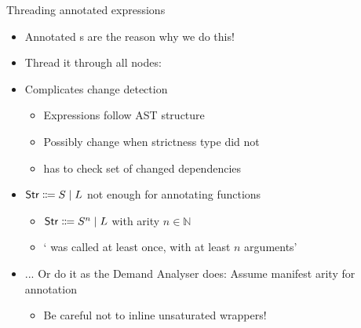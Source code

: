 \documentclass{haskellbeamer}
\begin{document}
\begin{frame}[fragile]{Threading annotated expressions}
  \begin{itemize}
    \item Annotated s are the reason why we do this!
    \item Thread it through all nodes: 
    \item Complicates change detection
      \begin{itemize}
        \item Expressions follow AST structure
        \item Possibly change when strictness type did not
        \item {} has to check set of changed dependencies
      \end{itemize}
    \item $\text{\textsf{Str}} \Coloneqq S \mid L$ not enough for annotating functions
      \begin{itemize}
        \item $\text{\textsf{Str}} \Coloneqq S^n \mid L$ with arity $n\in \mathbb{N}$
        \item ` was called at least once, with at least $n$ arguments'
      \end{itemize}
    \item ... Or do it as the Demand Analyser does: Assume manifest arity for annotation
      \begin{itemize}
        \item Be careful not to inline unsaturated wrappers!
      \end{itemize}
  \end{itemize}
\end{frame}
\end{document}
